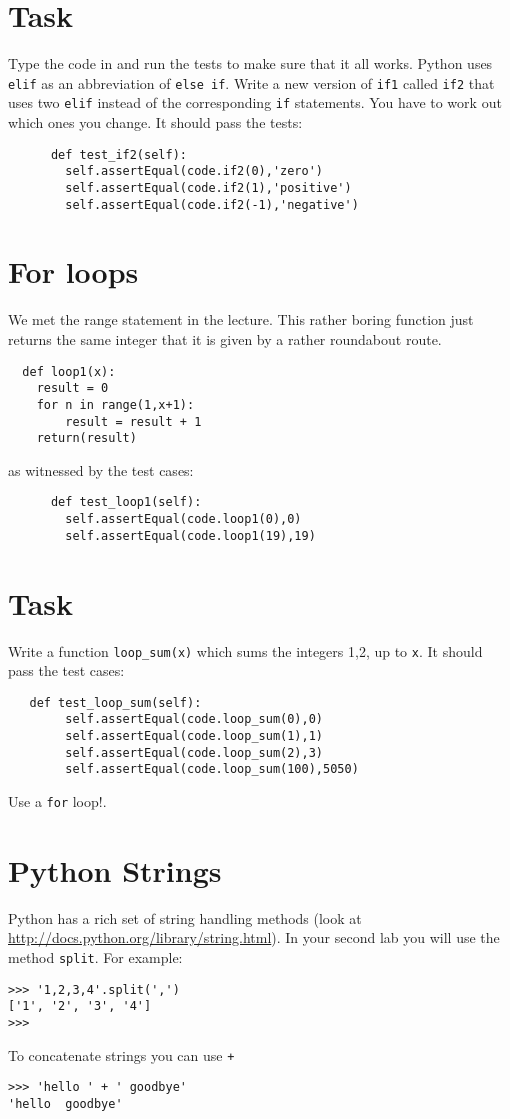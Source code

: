 \documentclass{paper}
\begin{document}
\section{Task}
Type the code in and run the tests to make sure that it all
works. Python uses {\tt elif} as an abbreviation of {\tt else
  if}. Write a new version of {\tt if1} called {\tt if2} that uses
two {\tt elif} instead of the corresponding {\tt if} statements. You
have to work out which ones you change. It should pass the tests:
\begin{lstlisting}
      def test_if2(self):
        self.assertEqual(code.if2(0),'zero')
        self.assertEqual(code.if2(1),'positive')
        self.assertEqual(code.if2(-1),'negative')
\end{lstlisting}

\section*{For loops}
We met the range statement in the lecture. This rather boring function
just returns the same integer that it is given by a rather roundabout
route.
\begin{lstlisting}
  def loop1(x):
    result = 0
    for n in range(1,x+1):
        result = result + 1
    return(result)
\end{lstlisting}
as witnessed by the test cases:
\begin{lstlisting}
      def test_loop1(self):
        self.assertEqual(code.loop1(0),0)
        self.assertEqual(code.loop1(19),19)
\end{lstlisting}

\section{Task}
Write a function {\tt loop\_sum(x)} which sums the integers 1,2, up to
{\tt x}. It should pass the test cases:
\begin{lstlisting}
   def test_loop_sum(self):
        self.assertEqual(code.loop_sum(0),0)
        self.assertEqual(code.loop_sum(1),1)
        self.assertEqual(code.loop_sum(2),3)
        self.assertEqual(code.loop_sum(100),5050)
\end{lstlisting}
Use a {\tt for} loop!.

\section*{Python Strings}

Python has a rich set of string handling methods (look at
\url{http://docs.python.org/library/string.html}). In your second lab you will
use the method {\tt split}. For example:
\begin{verbatim}
>>> '1,2,3,4'.split(',')
['1', '2', '3', '4']
>>>
\end{verbatim}
To concatenate strings you can use {\tt +}
\begin{verbatim}
>>> 'hello ' + ' goodbye'
'hello  goodbye'
\end{verbatim}
\end{document}
